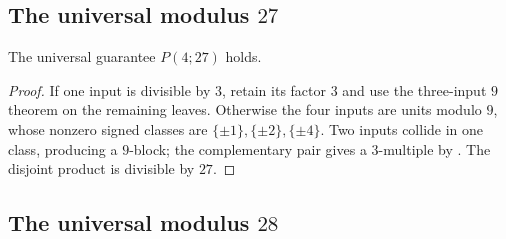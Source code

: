 \subsection{\texorpdfstring{The universal modulus $27$}{The universal modulus 27}}\label{app:p27}

\begin{theorem}\label{thm:p27}
The universal guarantee $P(4;27)$ holds.
\end{theorem}
\begin{proof}
If one input is divisible by $3$, retain its factor $3$ and use the
three-input $9$ theorem  on the remaining leaves.  Otherwise
the four inputs are units modulo $9$, whose nonzero signed classes are
$\{\pm1\},\{\pm2\},\{\pm4\}$.  Two inputs collide in one class, producing a
$9$-block; the complementary pair gives a $3$-multiple by
.  The disjoint product is divisible by $27$.
\end{proof}

\subsection{\texorpdfstring{The universal modulus $28$}{The universal modulus 28}}\label{app:p28}

